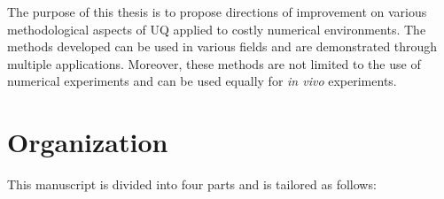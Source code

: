 \begin{warningbox}
The purpose of this thesis is to propose directions of improvement on various methodological aspects of UQ applied to costly numerical environments. The methods developed can be used in various fields and are demonstrated through multiple applications. Moreover, these methods are not limited to the use of numerical experiments and can be used equally for \emph{in vivo} experiments.	
\end{warningbox}



\section*{Organization}

This manuscript is divided into four parts and is tailored as follows: 

